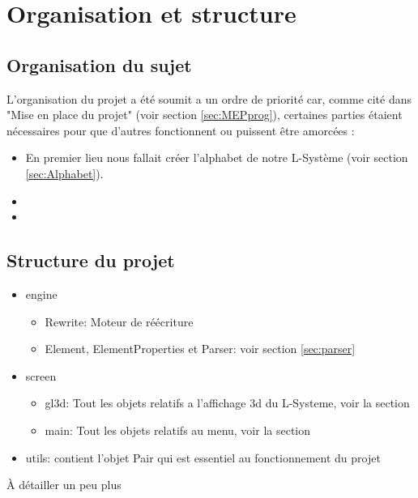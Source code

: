 \chapter{Organisation et structure}

\section{Organisation du sujet}
L'organisation du projet a été soumit a un ordre de priorité car, comme cité dans "Mise en place du projet" (voir section \ref{sec:MEPprog}), certaines parties étaient nécessaires pour que d'autres fonctionnent ou puissent être amorcées :
\begin{itemize}
    \item En premier lieu nous fallait créer l'alphabet de notre L-Système (voir section \ref{sec:Alphabet}).
    \item
    \item
\end{itemize}

\section{Structure du projet}
\begin{itemize}
    \item engine
    \begin{itemize}
        \item Rewrite: Moteur de réécriture
        \item Element, ElementProperties et Parser: voir section \ref{sec:parser}
    \end{itemize}
    \item screen
    \begin{itemize}
        \item gl3d: Tout les objets relatifs a l'affichage 3d du L-Systeme, voir la section \label{src:interface3d}
        \item main: Tout les objets relatifs au menu, voir la section \label{sec:menu}
    \end{itemize}
    \item utils: contient l'objet Pair qui est essentiel au fonctionnement du projet
\end{itemize}

À détailler un peu plus


